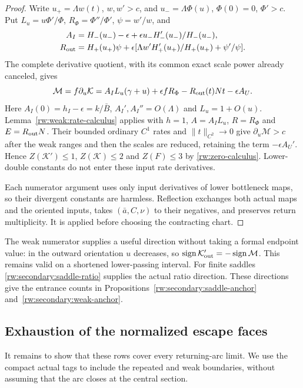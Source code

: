\begin{proof}
Write $u_+=\Lambda w(t)$, $w,w'>c$, and
$u_-=\Lambda\Phi(u)$, $\Phi(0)=0$, $\Phi'>c$.
Put $L_u=u\Phi'/\Phi$, $R_\Phi=\Phi''/\Phi'$,
$\psi=w'/w$, and
\[
\begin{aligned}
 A_I&=H_-(u_-)-\epsilon+
       \epsilon u_-H_-'(u_-)/H_-(u_-),\\
 R_{\rm out}&=H_+(u_+)\psi+
       \epsilon[\Lambda w'H_+'(u_+)/H_+(u_+)+\psi'/\psi].
\end{aligned}
\]
The complete derivative quotient, with its common exact scale power
already canceled, gives
\begin{equation}\label{rw:secondary:weak-numerator}
 \mathcal M=f\partial_u\mathcal K
 =A_IL_u(\gamma+u)+\epsilon fR_\Phi
       -R_{\rm out}(t)Nt-\epsilon A_U.
\end{equation}
Here $A_I(0)=h_I-\epsilon=k/\bar B$,
$A_I',A_I''=O(\Lambda)$ and $L_u=1+O(u)$.
Lemma~\ref{rw:weak:rate-calculus} applies with
$h=1$, $A=A_IL_u$, $R=R_\Phi$ and $E=R_{\rm out}N$.
Their bounded ordinary $C^1$ rates and $\|t\|_{C^2}\to0$ give
$\partial_u\mathcal M>c$ after the weak ranges and then the scales
are reduced, retaining the term $-\epsilon A_U'$.
Hence $Z(\mathcal K')\le1$, $Z(\mathcal K)\le2$ and
$Z(F)\le3$ by \ref{rw:zero-calculus}. Lower-double constants
do not enter these input rate derivatives.

Each numerator argument uses only input derivatives of lower
bottleneck maps, so their divergent constants are harmless.
Reflection exchanges both actual maps and the oriented inputs,
takes $(\bar a,C,\nu)$ to their negatives, and preserves return
multiplicity. It is applied before choosing the contracting chart.
\end{proof}

The weak numerator supplies a useful direction without taking a
formal endpoint value: in the outward orientation $u$ decreases,
so $\operatorname{sign}\mathcal K'_{\rm out}
=-\operatorname{sign}\mathcal M$.
This remains valid on a shortened lower-passing interval.
For finite saddles \eqref{rw:secondary:saddle-ratio} supplies the
actual ratio direction. These directions give the entrance counts in
Propositions~\ref{rw:secondary:saddle-anchor}
and~\ref{rw:secondary:weak-anchor}.

\subsection{Exhaustion of the normalized escape faces}

It remains to show that these rows cover every returning-arc limit.
We use the compact actual tags to include the repeated and weak
boundaries, without assuming that the arc closes at the central section.

